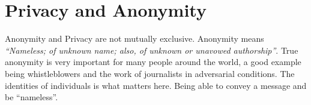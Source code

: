
\section{Privacy and Anonymity}

Anonymity and Privacy are not mutually exclusive. Anonymity means \textit{``Nameless; of unknown name; also, of unknown or unavowed authorship''}\cite{anonymous}. True anonymity is very important for many people around the world, a good example being whistleblowers and the work of journalists in adversarial conditions. The identities of individuals is what matters here. Being able to convey a message and be ``nameless''. 

